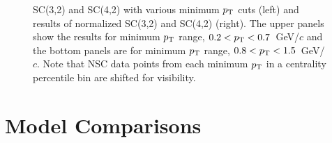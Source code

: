 \begin{figure}
\begin{center}
        \caption{SC(3,2) and SC(4,2) with various minimum $p_{\rm T}$ cuts (left) and results of normalized SC(3,2) and SC(4,2) (right). The upper panels show the results for minimum $p_{\rm T}$ range, $0.2<p_{\rm T}<0.7$~GeV/$c$ and the bottom panels are for minimum $p_{\rm T}$ range, $0.8<p_{\rm T}<1.5$~GeV/$c$. Note that NSC data points from each minimum $p_{\rm T}$ in a centrality percentile bin are shifted for visibility.}
        \label{fig:Figure_2}
        \end{center}   
\end{figure}
 

\section{Model Comparisons}
\label{sec:theory}
